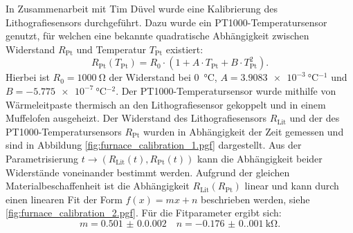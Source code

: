 In Zusammenarbeit mit Tim Düvel wurde eine Kalibrierung des Lithografiesensors durchgeführt.
Dazu wurde ein PT1000-Temperatursensor genutzt, für welchen eine bekannte quadratische Abhängigkeit zwischen Widerstand
$R_{\mathrm{Pt}}$ und Temperatur $T_{\mathrm{Pt}}$ existiert\autocite{din_pt}:
\begin{equation}
    R_{\mathrm{Pt}}(T_{\mathrm{Pt}})
    =R_0 \cdot (1 + A \cdot T_{\mathrm{Pt}} + B \cdot T_{\mathrm{Pt}}^2).
    \label{eq:pt1000_calibration}
\end{equation}
Hierbei ist $R_0 = \qty{1000}{\ohm}$ der Widerstand bei \qty{0}{\degreeCelsius},
$A = \qty{3.9083e-3}{\degreeCelsius^{-1}}$ und $B = \qty{-5.775e-7}{\degreeCelsius^{-2}}$.
Der PT1000-Temperatursensor wurde mithilfe von Wärmeleitpaste thermisch an den Lithografiesensor gekoppelt und
in einem Muffelofen ausgeheizt.
Der Widerstand des Lithografiesensors $R_\mathrm{Lit}$ und der des PT1000-Temperatursensors $R_\mathrm{Pt}$
wurden in Abhängigkeit der Zeit gemessen und sind in Abbildung \cref{fig:furnace_calibration_1.pgf} dargestellt.
Aus der Parametrisierung $t \to (R_\mathrm{Lit}(t), R_\mathrm{Pt}(t))$ kann die Abhängigkeit beider Widerstände
voneinander bestimmt werden.
Aufgrund der gleichen Materialbeschaffenheit ist die Abhängigkeit $R_\mathrm{Lit}(R_\mathrm{Pt})$ linear und kann durch
einen linearen Fit der Form $f(x)=mx+n$ beschrieben werden, siehe \cref{fig:furnace_calibration_2.pgf}.
Für die Fitparameter ergibt sich:
\begin{equation*}
    m = \num{0.501(0.0002)} \quad n = \qty{-0.176(0.001)}{\kilo\ohm}.
\end{equation*}

